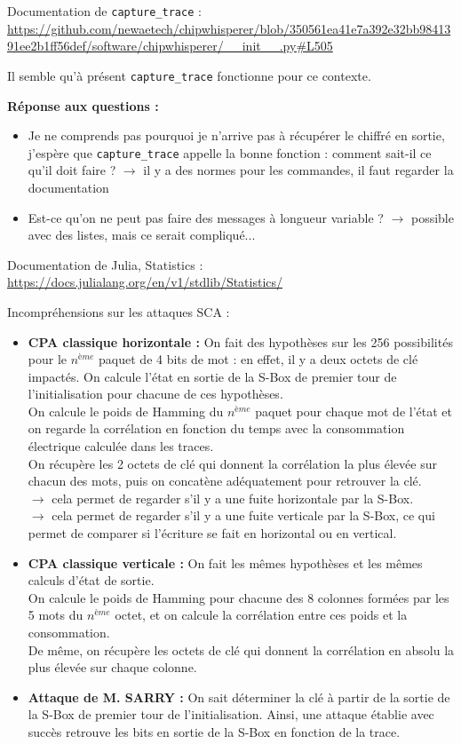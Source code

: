 \documentclass[12pt]{article}
\begin{document}
	\noindent Documentation de \verb|capture_trace| : \url{https://github.com/newaetech/chipwhisperer/blob/350561ea41e7a392e32bb9841391ee2b1ff56def/software/chipwhisperer/__init__.py#L505}
	
	\noindent Il semble qu'à présent \verb|capture_trace| fonctionne pour ce contexte.
	
	\noindent \textbf{Réponse aux questions :}
	\begin{itemize}
		\item  Je ne comprends pas pourquoi je n'arrive pas à récupérer le chiffré en sortie, j'espère que \verb|capture_trace| appelle la bonne fonction : comment sait-il ce qu'il doit faire ? $\rightarrow$ il y a des normes pour les commandes, il faut regarder la documentation
		\item Est-ce qu'on ne peut pas faire des messages à longueur variable ? $\rightarrow$ possible avec des listes, mais ce serait compliqué...
	\end{itemize}
	
	\noindent Documentation de Julia, Statistics : \url{https://docs.julialang.org/en/v1/stdlib/Statistics/}
	
	Incompréhensions sur les attaques SCA :
	\begin{itemize}
		\item \textbf{CPA classique horizontale :} On fait des hypothèses sur les 256 possibilités pour le $n^{ème}$ paquet de 4 bits de mot : en effet, il y a deux octets de clé impactés. On calcule l'état en sortie de la S-Box de premier tour de l'initialisation pour chacune de ces hypothèses.\\
		On calcule le poids de Hamming du $n^{ème}$ paquet pour chaque mot de l'état et on regarde la corrélation en fonction du temps avec la consommation électrique calculée dans les traces.\\
		On récupère les 2 octets de clé qui donnent la corrélation la plus élevée sur chacun des mots, puis on concatène adéquatement pour retrouver la clé.\\
		$\rightarrow$ cela permet de regarder s'il y a une fuite horizontale par la S-Box.\\
		$\rightarrow$ cela permet de regarder s'il y a une fuite verticale par la S-Box, ce qui permet de comparer si l'écriture se fait en horizontal ou en vertical.
		\item \textbf{CPA classique verticale :} On fait les mêmes hypothèses et les mêmes calculs d'état de sortie.\\
		On calcule le poids de Hamming pour chacune des 8 colonnes formées par les 5 mots du $n^{ème}$ octet, et on calcule la corrélation entre ces poids et la consommation.\\
		De même, on récupère les octets de clé qui donnent la corrélation en absolu la plus élevée sur chaque colonne.
		\item \textbf{Attaque de M. SARRY :} On sait déterminer la clé à partir de la sortie de la S-Box de premier tour de l'initialisation. Ainsi, une attaque établie avec succès retrouve les bits en sortie de la S-Box en fonction de la trace.
	\end{itemize}
\end{document}
